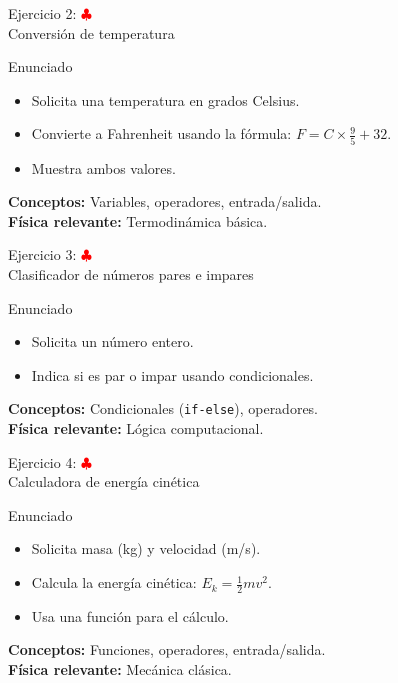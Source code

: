 \documentclass[10pt]{beamer}
\begin{document}
\begin{frame}{Ejercicio 2: \hfill \textcolor{red}{$\clubsuit$} \\ Conversión de temperatura}
  \begin{block}{Enunciado}
    \begin{itemize}
      \item Solicita una temperatura en grados Celsius.
      \item Convierte a Fahrenheit usando la fórmula: \(F = C \times \frac{9}{5} + 32\).
      \item Muestra ambos valores.
    \end{itemize}
  \end{block}
  \textbf{Conceptos:} Variables, operadores, entrada/salida.\\
  \textbf{Física relevante:} Termodinámica básica.
\end{frame}

\begin{frame}{Ejercicio 3: \hfill \textcolor{red}{$\clubsuit$} \\ Clasificador de números pares e impares}
  \begin{block}{Enunciado}
    \begin{itemize}
      \item Solicita un número entero.
      \item Indica si es par o impar usando condicionales.
    \end{itemize}
  \end{block}
  \textbf{Conceptos:} Condicionales (\texttt{if-else}), operadores.\\
  \textbf{Física relevante:} Lógica computacional.
\end{frame}

\begin{frame}{Ejercicio 4: \hfill \textcolor{red}{$\clubsuit$} \\ Calculadora de energía cinética}
  \begin{block}{Enunciado}
    \begin{itemize}
      \item Solicita masa (kg) y velocidad (m/s).
      \item Calcula la energía cinética: \(E_k = \frac{1}{2} m v^2\).
      \item Usa una función para el cálculo.
    \end{itemize}
  \end{block}
  \textbf{Conceptos:} Funciones, operadores, entrada/salida.\\
  \textbf{Física relevante:} Mecánica clásica.
\end{frame}
\end{document}
